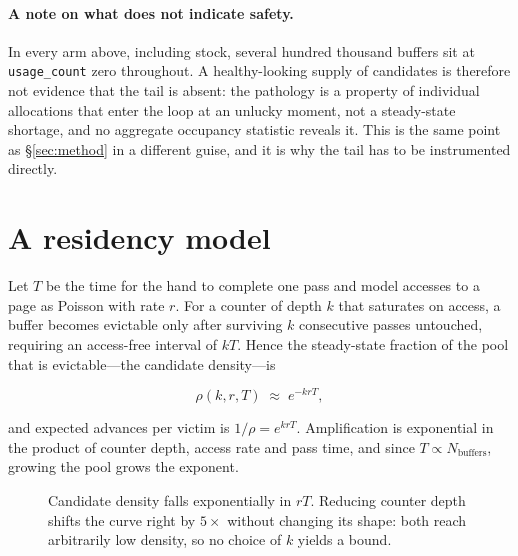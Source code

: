 \documentclass[sigconf,nonacm]{acmart}
\begin{document}
\paragraph{A note on what does not indicate safety.} In every arm above,
including stock, several hundred thousand buffers sit at \texttt{usage\_count}
zero throughout. A healthy-looking supply of candidates is therefore not
evidence that the tail is absent: the pathology is a property of individual
allocations that enter the loop at an unlucky moment, not a steady-state
shortage, and no aggregate occupancy statistic reveals it. This is the same
point as \S\ref{sec:method} in a different guise, and it is why the tail has to
be instrumented directly.

\section{A residency model}
\label{sec:model}

Let $T$ be the time for the hand to complete one pass and model accesses to a
page as Poisson with rate $r$. For a counter of depth $k$ that saturates on
access, a buffer becomes evictable only after surviving $k$ consecutive passes
untouched, requiring an access-free interval of $kT$. Hence the steady-state
fraction of the pool that is evictable---the candidate density---is

\begin{equation}
\rho(k, r, T) \;\approx\; e^{-k r T},
\label{eq:density}
\end{equation}

and expected advances per victim is $1/\rho = e^{krT}$. Amplification is
exponential in the product of counter depth, access rate and pass time, and
since $T \propto N_{\text{buffers}}$, growing the pool grows the exponent.

\begin{figure}[t]
\centering
{}
\caption{Candidate density falls exponentially in $rT$. Reducing counter depth
shifts the curve right by $5\times$ without changing its shape: both reach
arbitrarily low density, so no choice of $k$ yields a bound.}
\label{fig:density}
\end{figure}
\end{document}
